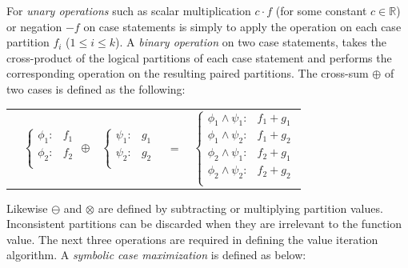 \documentclass{article} %
\begin{document}
For \emph{unary operations} such as scalar multiplication $c\cdot f$ (for some constant $c \in \mathbb{R}$) or negation $-f$ on case statements is simply to apply the operation on each case partition $f_i$ ($1 \leq i \leq k$). 
A \emph{binary operation} on two case statements, takes the cross-product of the logical partitions of each case statement and performs the corresponding operation on the resulting paired partitions.  The cross-sum $\oplus$ of two cases is defined as the following:
{\footnotesize 
\begin{center}
\begin{tabular}{r c c c l}
&
\hspace{-6mm} 
  $\begin{cases}
    \phi_1: & f_1 \\ 
    \phi_2: & f_2 \\ 
  \end{cases}$
$\oplus$
&
\hspace{-4mm}
  $\begin{cases}
    \psi_1: & g_1 \\ 
    \psi_2: & g_2 \\ 
  \end{cases}$
&
\hspace{-2mm} 
$ = $
&
\hspace{-2mm}
  $\begin{cases}
  \phi_1 \wedge \psi_1: & f_1 + g_1 \\ 
  \phi_1 \wedge \psi_2: & f_1 + g_2 \\ 
  \phi_2 \wedge \psi_1: & f_2 + g_1 \\ 
  \phi_2 \wedge \psi_2: & f_2 + g_2 \\ 
  \end{cases}$
\end{tabular}
\end{center}
}
Likewise $\ominus$ and $\otimes$ are defined by subtracting or multiplying partition values.  Inconsistent partitions can be discarded when they are irrelevant to the function value.
The next three operations are required in defining the value iteration algorithm. A \emph{symbolic case maximization} is defined as below:
\vspace{-4mm}
\end{document}
